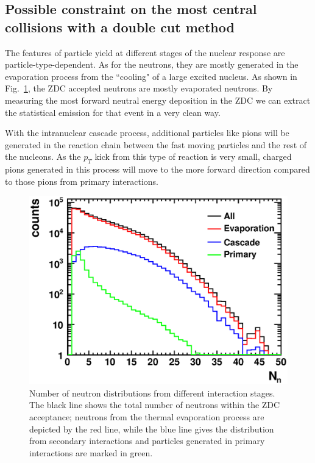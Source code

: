 \subsection{Possible constraint on the most central collisions with a double cut method}

The features of particle yield at different stages of the nuclear response
are particle-type-dependent. As for the neutrons, they are mostly generated
in the evaporation process from the ``cooling" of a large excited nucleus.
As shown in Fig.~\ref{fig:neutronStage}, the ZDC accepted
neutrons are mostly evaporated neutrons. By measuring the most forward
neutral energy deposition in the ZDC we can extract the statistical emission
for that event in a very clean way.

With the intranuclear cascade process, additional particles like pions
will be generated in the reaction chain between the fast moving particles
and the rest of the nucleons.
As the $p_{T}$ kick from this type of reaction is very small, charged pions
generated in this process will move to the more forward direction compared
to those pions from primary interactions.


\begin{figure}
\begin{center}
\includegraphics[width=0.7\columnwidth]{plots/chpt7/accept_neutron_from_stages.eps}
\caption[Accepted neutrons from different stages]{Number of neutron distributions
from different interaction stages. The black line shows the total number of neutrons
within the ZDC acceptance; neutrons from the thermal evaporation process are depicted
by the red line, while the blue line gives the distribution from secondary
interactions and particles generated in primary interactions are marked in green.}
\label{fig:neutronStage}
\end{center}
\end{figure}




